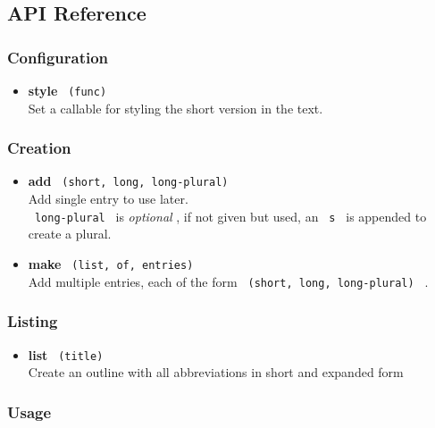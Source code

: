 
\subsection{API Reference}\label{api-reference}

\subsubsection{Configuration}\label{configuration}

\begin{itemize}
\tightlist
\item
  \textbf{style} \texttt{\ (func)\ }\\
  Set a callable for styling the short version in the text.
\end{itemize}

\subsubsection{Creation}\label{creation}

\begin{itemize}
\item
  \textbf{add} \texttt{\ (short,\ long,\ long-plural)\ }\\
  Add single entry to use later.\\
  \texttt{\ long-plural\ } is \emph{optional} , if not given but used,
  an \texttt{\ s\ } is appended to create a plural.
\item
  \textbf{make} \texttt{\ (list,\ of,\ entries)\ }\\
  Add multiple entries, each of the form
  \texttt{\ (short,\ long,\ long-plural)\ } .
\end{itemize}

\subsubsection{Listing}\label{listing}

\begin{itemize}
\tightlist
\item
  \textbf{list} \texttt{\ (title)\ }\\
  Create an outline with all abbreviations in short and expanded form
\end{itemize}

\subsubsection{Usage}\label{usage}

